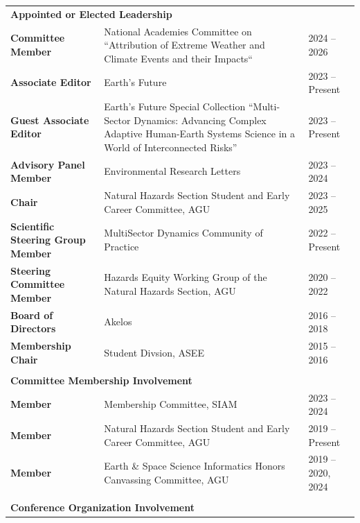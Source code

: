 \documentclass{article}[12pt]
\begin{document}
	\vspace{-2em}
	\noindent
	\begin{flushleft}
		\begin{tabularx}{\textwidth}{lXl}
			\multicolumn{3}{l}{\large{\textbf{Appointed or Elected Leadership}}}\\
			\textbf{Committee Member} & National Academies Committee on ``Attribution of Extreme Weather and Climate Events and their Impacts`` & 2024 -- 2026 \\
			\textbf{Associate Editor} & Earth's Future & 2023 -- Present \\
			\textbf{Guest Associate Editor} & Earth's Future Special Collection ``Multi-Sector Dynamics: Advancing Complex Adaptive Human-Earth Systems Science in a World of Interconnected Risks'' & 2023 -- Present \\
			\textbf{Advisory Panel Member} & Environmental Research Letters & 2023 -- 2024\\
			\textbf{Chair} & Natural Hazards Section Student and Early Career Committee, AGU & 2023 -- 2025 \\
			\textbf{Scientific Steering Group Member} & MultiSector Dynamics Community of Practice  & 2022 -- Present \\
			\textbf{Steering Committee Member} & Hazards Equity Working Group of the Natural \newline Hazards Section, AGU & 2020 -- 2022 \\
			\textbf{Board of Directors} & Akelos & 2016 -- 2018 \\
			\textbf{Membership Chair} & Student Divsion, ASEE  & 2015 -- 2016 \\
			\\
			\multicolumn{3}{l}{\large{\textbf{Committee Membership Involvement}}}\\ 
			\textbf{Member} & Membership Committee, SIAM & 2023 -- 2024 \\
			\textbf{Member} & Natural Hazards Section Student and Early Career Committee, AGU & 2019 -- Present \\
			\textbf{Member} & Earth \& Space Science Informatics Honors Canvassing Committee, AGU  & 2019 -- 2020, 2024 \\
			\\
			\multicolumn{3}{l}{\large{\textbf{Conference Organization Involvement}}}\\

\end{tabularx}
\end{flushleft}
\end{document}
